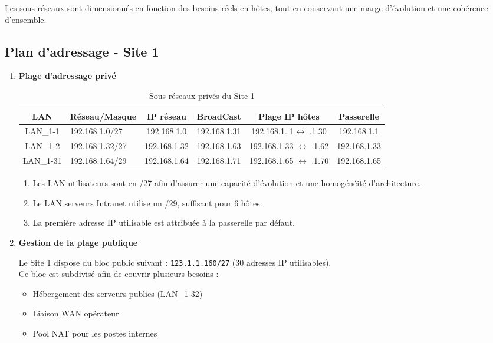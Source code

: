 \documentclass[12pt,a4paper, oneside]{memoir}
\begin{document}
Les sous-réseaux sont dimensionnés en fonction des besoins réels en hôtes, tout en conservant une marge d’évolution et une cohérence d’ensemble.

\subsection{Plan d'adressage - Site 1}

\begin{enumerate}
	\item \textbf{Plage d’adressage privé}

\begin{table}[]
	\centering
	\begin{tabular}{|c|l|c|c|c|c|}
		\hline
		\textbf{LAN} &  \textbf{Réseau/Masque}  & \textbf{IP réseau} & \textbf{BroadCast} & \textbf{Plage IP hôtes} & \textbf{Passerelle} \\
		\hline
		LAN\_1-1   & 192.168.1.0/27 &  192.168.1.0 & 192.168.1.31 & 192.168.1. 1$\leftrightarrow$ .1.30 & 192.168.1.1 \\
		LAN\_1-2   & 192.168.1.32/27 & 192.168.1.32 & 192.168.1.63  & 192.168.1.33 $\leftrightarrow$ .1.62 & 192.168.1.33\\
		LAN\_1-31 & 192.168.1.64/29 &192.168.1.64 & 192.168.1.71 & 192.168.1.65 $\leftrightarrow$ .1.70 & 192.168.1.65 \\
		\hline
	\end{tabular}
	\caption{Sous-réseaux privés du Site 1}
\end{table}
	\vspace{0.5cm}
	
	\begin{enumerate}
		\item Les LAN utilisateurs sont en /27 afin d’assurer une capacité d’évolution et une homogénéité d’architecture.\\
		\item Le LAN serveurs Intranet utilise un /29, suffisant pour 6 hôtes.\\
		\item La première adresse IP utilisable est attribuée à la passerelle par défaut.	\\ 
	\end{enumerate}
 
	\item \textbf{Gestion de la plage publique}

Le Site 1 dispose du bloc public suivant : \texttt{123.1.1.160/27} (30 adresses IP utilisables).\\
Ce bloc est subdivisé afin de couvrir plusieurs besoins : 
\begin{itemize}[label*=$\rightarrow$]
	\item Hébergement des serveurs publics (LAN\_1-32)
	\item Liaison WAN opérateur
	\item Pool NAT pour les postes internes
\end{itemize}


\end{enumerate}
\end{document}
